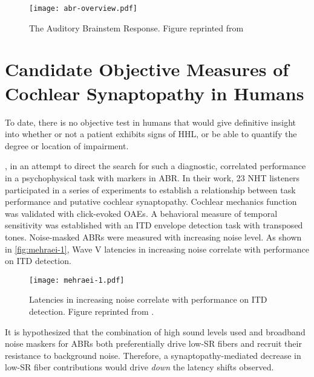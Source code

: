 \begin{figure}[htbp]
	\centering
	\texttt{[image: abr-overview.pdf]}
	\caption[The Auditory Brainstem Response]{The Auditory Brainstem Response.  Figure reprinted from \cite{Durrant2008Manifestations}}
	\label{fig:abr-outline}
\end{figure}

\section{Candidate Objective Measures of Cochlear Synaptopathy in Humans} %
\label{sec:objective_measures_of_cochlear_synaptopathy}
To date, there is no objective test in humans that would give definitive insight into whether or not a patient exhibits signs of HHL, or be able to quantify the degree or location of impairment. 

\cite{Mehraei2015Auditory}, in an attempt to direct the search for such a diagnostic, correlated performance in a psychophysical task with markers in ABR.  In their work, 23 NHT listeners participated in a series of experiments to establish a relationship between task performance and putative cochlear synaptopathy.   Cochlear mechanics function was validated with click-evoked OAEs.  A behavioral measure of temporal sensitivity was established with an ITD envelope detection task with transposed tones.  Noise-masked ABRs were measured with increasing noise level.   As shown in \autoref{fig:mehraei-1}, Wave V latencies in increasing noise correlate with performance on ITD detection.

\begin{figure}[htbp]
	\centering
	\texttt{[image: mehraei-1.pdf]}
	\caption[Latency in Noise]{Latencies in increasing noise correlate with performance on ITD detection.  Figure reprinted from \cite{Mehraei2016Auditory}.}
	\label{fig:mehraei-1}
\end{figure}

It is hypothesized that the combination of high sound levels used and broadband noise maskers for ABRs both preferentially drive low-SR fibers and recruit their resistance to background noise.  Therefore, a synaptopathy-mediated decrease in low-SR fiber contributions would drive \emph{down} the latency shifts observed.
